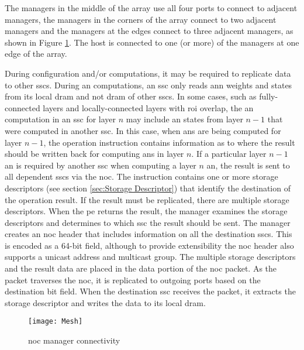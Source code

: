 The managers in the middle of the array use all four ports to connect to adjacent managers, the managers in the corners of the array connect to two adjacent managers and the managers at the edges connect to three adjacent managers, as shown in Figure \ref{fig:Mesh}.
The host is connected to one (or more) of the managers at one edge of the array. 

During configuration and/or computations, it may be required to replicate data to other \acp{ssc}.
During \ac{an} computations, an \ac{ssc} only reads \ac{ann} weights and states from its local \ac{dram} and not \ac{dram} of other \acp{ssc}.
In some cases, such as fully-connected layers and locally-connected layers with \ac{roi} overlap, the \ac{an} computation in an \ac{ssc} for layer $n$ may include \ac{an} states from layer $n-1$ that were computed in another \ac{ssc}.
In this case, when \acp{an} are being computed for layer $n-1$, the operation instruction contains information as to where the result should be written back for computing \acp{an} in layer $n$.
If a particular layer $n-1$ \ac{an} is required by another \ac{ssc} when computing a layer $n$ \ac{an}, the result is sent to all dependent \acp{ssc} via the \ac{noc}.
The instruction contains one or more storage descriptors (see section \ref{sec:Storage Descriptor}) that identify the destination of the operation result.
If the result must be replicated, there are multiple storage descriptors. When the \ac{pe} returns the result, the manager examines the storage descriptors and determines to which \ac{ssc} the result should be sent.
The manager creates an \ac{noc} header that includes information on all the destination \acp{ssc}. 
This is encoded as a 64-bit field, although to provide extensibility the \ac{noc} header also supports a unicast address and multicast group. 
The multiple storage descriptors and the result data are placed in the data portion of the \ac{noc} packet.
As the packet traverses the \ac{noc}, it is replicated to outgoing ports based on the destination bit field.
When the destination \ac{ssc} receives the packet, it extracts the storage descriptor and writes the data to its local \ac{dram}.

\begin{figure}[!t]
\centering
\captionsetup{justification=centering}
\centerline{
\mbox{\texttt{[image: Mesh]}}
}
\caption{\ac{noc} manager connectivity}
\label{fig:Mesh}
\end{figure}

